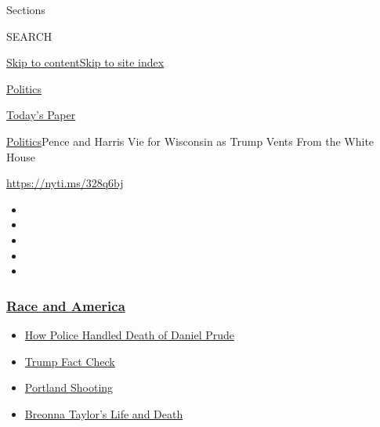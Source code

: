 Sections

SEARCH

\protect\hyperlink{site-content}{Skip to
content}\protect\hyperlink{site-index}{Skip to site index}

\href{https://www.nytimes3xbfgragh.onion/section/politics}{Politics}

\href{https://myaccount.nytimes3xbfgragh.onion/auth/login?response_type=cookie\&client_id=vi}{}

\href{https://www.nytimes3xbfgragh.onion/section/todayspaper}{Today's
Paper}

\href{/section/politics}{Politics}\textbar{}Pence and Harris Vie for
Wisconsin as Trump Vents From the White House

\url{https://nyti.ms/328q6bj}

\begin{itemize}
\item
\item
\item
\item
\item
\end{itemize}

\hypertarget{race-and-america}{%
\subsubsection{\texorpdfstring{\href{https://www.nytimes3xbfgragh.onion/news-event/george-floyd-protests-minneapolis-new-york-los-angeles?name=styln-george-floyd\&region=TOP_BANNER\&block=storyline_menu_recirc\&action=click\&pgtype=Article\&impression_id=184058b0-f1bb-11ea-acbc-41a7f42c3c41\&variant=undefined}{Race
and America}}{Race and America}}\label{race-and-america}}

\begin{itemize}
\tightlist
\item
  \href{https://www.nytimes3xbfgragh.onion/2020/09/04/nyregion/rochester-police-daniel-prude.html?name=styln-george-floyd\&region=TOP_BANNER\&block=storyline_menu_recirc\&action=click\&pgtype=Article\&impression_id=184058b1-f1bb-11ea-acbc-41a7f42c3c41\&variant=undefined}{How
  Police Handled Death of Daniel Prude}
\item
  \href{https://www.nytimes3xbfgragh.onion/2020/09/01/us/politics/trump-fact-check-protests.html?name=styln-george-floyd\&region=TOP_BANNER\&block=storyline_menu_recirc\&action=click\&pgtype=Article\&impression_id=184058b2-f1bb-11ea-acbc-41a7f42c3c41\&variant=undefined}{Trump
  Fact Check}
\item
  \href{https://www.nytimes3xbfgragh.onion/2020/08/30/us/portland-shooting-explained.html?name=styln-george-floyd\&region=TOP_BANNER\&block=storyline_menu_recirc\&action=click\&pgtype=Article\&impression_id=184058b3-f1bb-11ea-acbc-41a7f42c3c41\&variant=undefined}{Portland
  Shooting}
\item
  \href{https://www.nytimes3xbfgragh.onion/2020/08/30/us/breonna-taylor-police-killing.html?name=styln-george-floyd\&region=TOP_BANNER\&block=storyline_menu_recirc\&action=click\&pgtype=Article\&impression_id=184058b4-f1bb-11ea-acbc-41a7f42c3c41\&variant=undefined}{Breonna
  Taylor's Life and Death}
\end{itemize}

